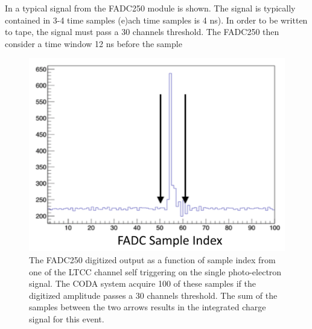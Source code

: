 In  a typical signal from the FADC250 module is shown. The signal is typically contained in 3-4 time samples (e)ach time samples is 4 ns).
In order to be written to tape, the signal must pass a 30 channels threshold. The FADC250 then consider a time window 12 ns before the sample


\begin{figure}
	\centering
	\includegraphics[width=0.95\columnwidth,keepaspectratio]{img/fadc.png}
	\caption{The FADC250 digitized output as a function of sample index from one of the LTCC channel self triggering on the single photo-electron signal.
            The CODA system acquire 100 of these samples if the digitized amplitude passes a 30 channels threshold. The sum of the samples between
				the two arrows results in the integrated charge signal for this event.}
	\label{fig:fadc}
\end{figure}




